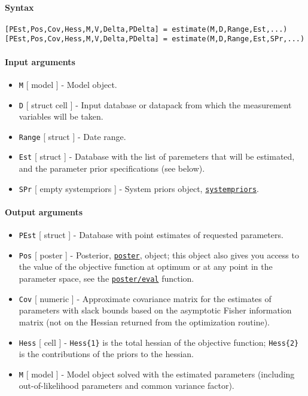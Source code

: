 


	\paragraph{Syntax}

\begin{verbatim}
[PEst,Pos,Cov,Hess,M,V,Delta,PDelta] = estimate(M,D,Range,Est,...)
[PEst,Pos,Cov,Hess,M,V,Delta,PDelta] = estimate(M,D,Range,Est,SPr,...)
\end{verbatim}

\paragraph{Input arguments}

\begin{itemize}
\item
  \texttt{M} {[} model {]} - Model object.
\item
  \texttt{D} {[} struct \textbar{} cell {]} - Input database or datapack
  from which the measurement variables will be taken.
\item
  \texttt{Range} {[} struct {]} - Date range.
\item
  \texttt{Est} {[} struct {]} - Database with the list of paremeters
  that will be estimated, and the parameter prior specifications (see
  below).
\item
  \texttt{SPr} {[} empty \textbar{} systempriors {]} - System priors
  object, \href{systempriors/Contents}{\texttt{systempriors}}.
\end{itemize}

\paragraph{Output arguments}

\begin{itemize}
\item
  \texttt{PEst} {[} struct {]} - Database with point estimates of
  requested parameters.
\item
  \texttt{Pos} {[} poster {]} - Posterior,
  \href{poster/Contents}{\texttt{poster}}, object; this object also
  gives you access to the value of the objective function at optimum or
  at any point in the parameter space, see the
  \href{poster/eval}{\texttt{poster/eval}} function.
\item
  \texttt{Cov} {[} numeric {]} - Approximate covariance matrix for the
  estimates of parameters with slack bounds based on the asymptotic
  Fisher information matrix (not on the Hessian returned from the
  optimization routine).
\item
  \texttt{Hess} {[} cell {]} - \texttt{Hess\{1\}} is the total hessian
  of the objective function; \texttt{Hess\{2\}} is the contributions of
  the priors to the hessian.
\item
  \texttt{M} {[} model {]} - Model object solved with the estimated
  parameters (including out-of-likelihood parameters and common variance
  factor).
\end{itemize}

